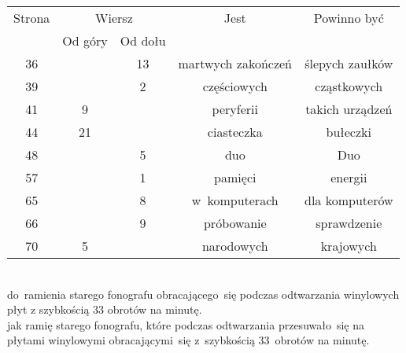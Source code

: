 \documentclass[a4paper,11pt]{article}
\numberwithin{equation}{section}
\begin{document}
\begin{center}

  \begin{tabular}{|c|c|c|c|c|}
    \hline
    Strona & \multicolumn{2}{c|}{Wiersz} & Jest
    & Powinno być \\ \cline{2-3}
           & Od góry & Od dołu & & \\
    \hline
    36 & & 13 & martwych zakończeń & ślepych zaułków \\
    39 & & \hphantom{0}2 & częściowych & cząstkowych \\
    41 & \hphantom{0}9 & & peryferii & takich urządzeń \\
    44 & 21 & & ciasteczka & bułeczki \\
    48 & & \hphantom{0}5 & duo & Duo \\
    57 & & \hphantom{0}1 & pamięci & energii \\
    65 & & \hphantom{0}8 & w~komputerach & dla komputerów \\
    66 & & \hphantom{0}9 & próbowanie & sprawdzenie \\
    70 & \hphantom{0}5 & & narodowych & krajowych \\
    \hline
  \end{tabular}

\end{center}

\VerSpaceSix


\noindent
{} \\
\Jest do~ramienia starego fonografu obracającego~się podczas odtwarzania
winylowych płyt z szybkością 33 obrotów na minutę. \\
\PowinnoByc jak ramię starego fonografu, które podczas odtwarzania
przesuwało~się na płytami winylowymi obracającymi~się z~szybkością
33~obrotów na minutę. \\













\printbibliography





\end{document}
